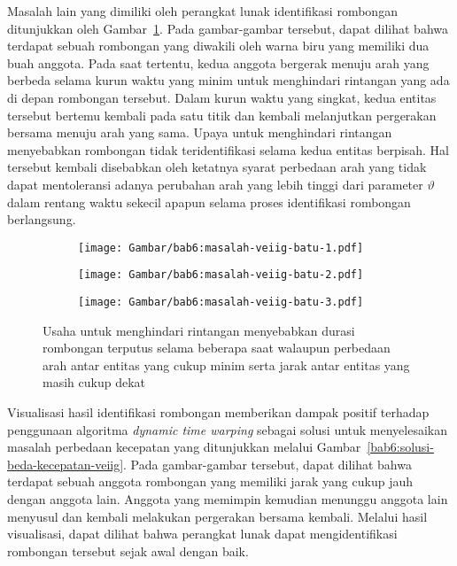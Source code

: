 Masalah lain yang dimiliki oleh perangkat lunak identifikasi rombongan ditunjukkan oleh Gambar~\ref{bab6:masalah-rintangan-veiig}. Pada gambar-gambar tersebut, dapat dilihat bahwa terdapat sebuah rombongan yang diwakili oleh warna biru yang memiliki dua buah anggota. Pada saat tertentu, kedua anggota bergerak menuju arah yang berbeda selama kurun waktu yang minim untuk menghindari rintangan yang ada di depan rombongan tersebut. Dalam kurun waktu yang singkat, kedua entitas tersebut bertemu kembali pada satu titik dan kembali melanjutkan pergerakan bersama menuju arah yang sama. Upaya untuk menghindari rintangan menyebabkan rombongan tidak teridentifikasi selama kedua entitas berpisah. Hal tersebut kembali disebabkan oleh ketatnya syarat perbedaan arah yang tidak dapat mentoleransi adanya perubahan arah yang lebih tinggi dari parameter $\vartheta$ dalam rentang waktu sekecil apapun selama proses identifikasi rombongan berlangsung.

\begin{figure}[h!]
    \centering
    \captionsetup{width=.8\textwidth}
    \begin{subfigure}[t]{0.25\textwidth}
        \centering
        \texttt{[image: Gambar/bab6:masalah-veiig-batu-1.pdf]}
    \end{subfigure}
    \begin{subfigure}[t]{0.275\textwidth}
        \centering
        \texttt{[image: Gambar/bab6:masalah-veiig-batu-2.pdf]}
    \end{subfigure}
    \begin{subfigure}[t]{0.25\textwidth}
        \centering
        \texttt{[image: Gambar/bab6:masalah-veiig-batu-3.pdf]}
    \end{subfigure}
    \caption[Masalah menghindari rintangan]{Usaha untuk menghindari rintangan menyebabkan durasi rombongan terputus selama beberapa saat walaupun perbedaan arah antar entitas yang cukup minim serta jarak antar entitas yang masih cukup dekat}
    \label{bab6:masalah-rintangan-veiig}
\end{figure}

Visualisasi hasil identifikasi rombongan memberikan dampak positif terhadap penggunaan algoritma \textit{dynamic time warping} sebagai solusi untuk menyelesaikan masalah perbedaan kecepatan yang ditunjukkan melalui Gambar~\ref{bab6:solusi-beda-kecepatan-veiig}. Pada gambar-gambar tersebut, dapat dilihat bahwa terdapat sebuah anggota rombongan yang memiliki jarak yang cukup jauh dengan anggota lain. Anggota yang memimpin kemudian menunggu anggota lain menyusul dan kembali melakukan pergerakan bersama kembali. Melalui hasil visualisasi, dapat dilihat bahwa perangkat lunak dapat mengidentifikasi rombongan tersebut sejak awal dengan baik.

